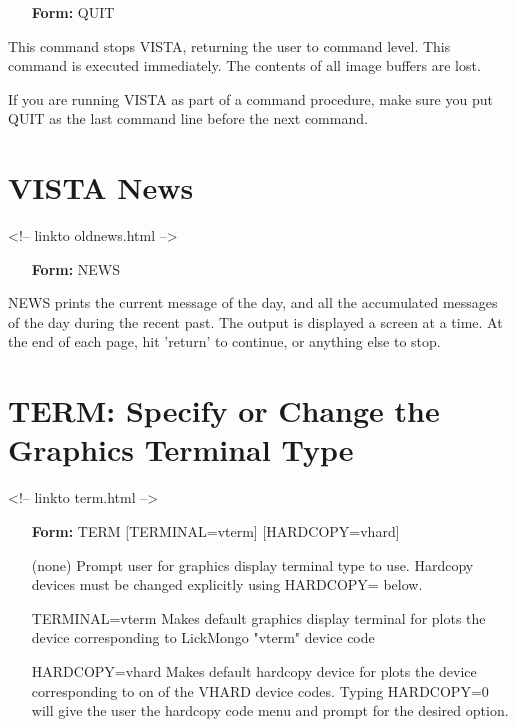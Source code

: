 \begin{itemize}
   \item[\textbf{Form: } QUIT\hfill]{}
\end{itemize}

This command stops VISTA, returning the user to command level.  This
command is executed immediately. The contents of all image buffers are
lost.

If you are running VISTA as part of a command procedure, make sure you put
QUIT as the last command line before the next command.

\section{VISTA News}
\begin{rawhtml}
<!-- linkto oldnews.html -->
\end{rawhtml}

\begin{itemize}
  \item[\textbf{Form: } NEWS\hfill]{}
\end{itemize}

NEWS prints the current message of the day, and all the accumulated
messages of the day during the recent past.  The output is displayed a
screen at a time.  At the end of each page, hit 'return' to continue, or
anything else to stop.

\section{TERM: Specify or Change the Graphics Terminal Type}
\begin{rawhtml}
<!-- linkto term.html -->
\end{rawhtml}

\begin{itemize}
   \item[\textbf{Form: } TERM {[TERMINAL=vterm]} {[HARDCOPY=vhard]}\hfill]{}

   \item[(none)]{Prompt user for graphics display terminal type to use.
        Hardcopy devices must be changed explicitly using HARDCOPY= below.}

   \item[TERMINAL=vterm]{Makes default graphics display terminal for plots
        the device corresponding to LickMongo "vterm" device code}

   \item[HARDCOPY=vhard]{Makes default hardcopy device for plots the device
        corresponding to on of the VHARD device codes.  Typing HARDCOPY=0
        will give the user the hardcopy code menu and prompt for the
        desired option.}
\end{itemize}

